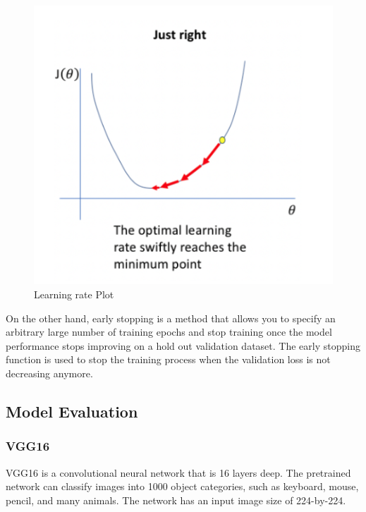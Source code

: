 \begin{figure}[h]
\centering
\includegraphics[scale=0.6]{lr-schedule.png}
\caption{Learning rate Plot}
\end{figure}

On the other hand, early stopping is a method that allows you to specify an arbitrary large number of training epochs and stop training once the model performance stops improving on a hold out validation dataset. The early stopping function is used to stop the training process when the validation loss is not decreasing anymore.

\subsection*{Model Evaluation}
\subsubsection*{VGG16}
VGG16 is a convolutional neural network that is 16 layers deep. The pretrained network can classify images into 1000 object categories, such as keyboard, mouse, pencil, and many animals. The network has an input image size of 224-by-224.

